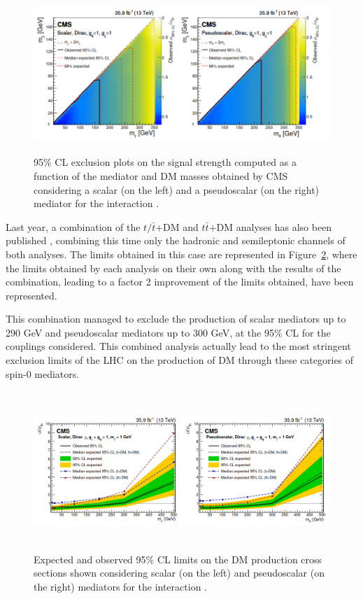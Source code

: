 \documentclass[a4paper, 10pt, openright]{report}
\begin{document}
\begin{figure}[htbp]
\begin{center}
\includegraphics[width=14cm, height=6cm]{figs/CMSttbarExclusion.png}
\caption{95\% \ac{CL} exclusion plots on the signal strength computed as a function of the mediator and \ac{DM} masses obtained by \ac{CMS} considering a scalar (on the left) and a pseudoscalar (on the right) mediator for the interaction \cite{PreviousDoubleTopAllLep13CMS}.}
\label{figure:CMSttbarExclusion}
\end{center}
\end{figure}

Last year, a combination of the $t/\bar t$+DM and $t \bar t$+DM analyses has also been published \cite{PreviousSingleDoubleTopAllLep13CMS}, combining this time only the hadronic and semileptonic channels of both analyses. The limits obtained in this case are represented in Figure~\ref{figure:Combination2019}, where the limits obtained by each analysis on their own along with the results of the combination, leading to a factor 2 improvement of the limits obtained, have been represented. 

This combination managed to exclude the production of scalar mediators up to 290 GeV and pseudoscalar mediators up to 300 GeV, at the 95\% \ac{CL} for the couplings considered. This combined analysis actually lead to the most stringent exclusion limits of the \ac{LHC} on the production of \ac{DM} through these categories of spin-0 mediators.

\begin{figure}[htbp]
\begin{center}
\includegraphics[width=14cm, height=6cm]{figs/Combination2019.png}
\caption{Expected and observed 95\% \ac{CL} limits on the \ac{DM} production cross sections shown considering scalar (on the left) and pseudoscalar (on the right) mediators for the interaction \cite{PreviousSingleDoubleTopAllLep13CMS}.}
\label{figure:Combination2019}
\end{center}
\end{figure}
\end{document}
